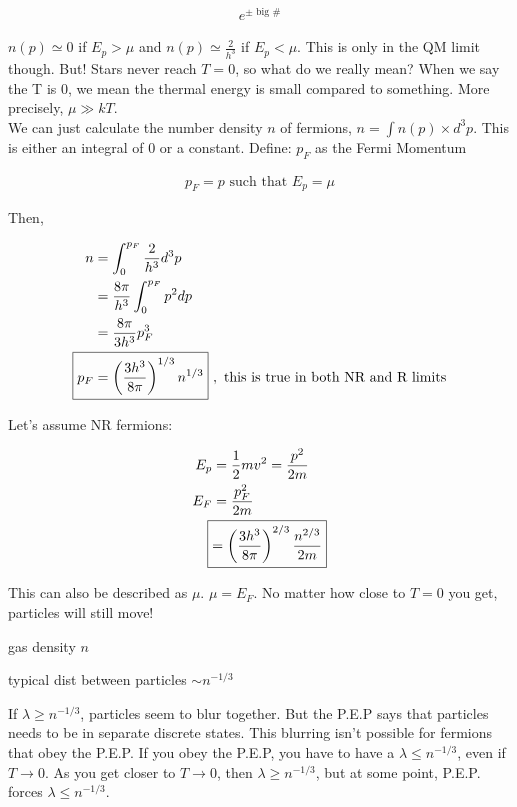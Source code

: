 \begin{align}
e^{\pm \text{ big \#}}
\end{align}

$n(p) \simeq 0 $ if $E_p > \mu$ and $n(p) \simeq \frac{2}{h^3} $ if $E_p < \mu$. This is only in the QM limit though. But! Stars never reach $T = 0$, so what do we really mean? When we say the T is 0, we mean the thermal energy is small compared to something. More precisely, $\mu \gg kT$. \\

We can just calculate the number density $n$ of fermions, $n = \int n(p) \times d^3p$. This is either an integral of 0 or a constant. Define: $p_F$ as the Fermi Momentum

\begin{align}
p_F = p \text{ such that }E_p = \mu
\end{align}

Then, 

\begin{align}
n &= \int_{0}^{p_F} \frac{2}{h^3}d^3p\\
&= \frac{8 \pi}{h^3} \int_0^{p_F} p^2 dp\\
&= \frac{8 \pi}{3h^3} p_F^3\\
\Aboxed{p_F &= \lp \frac{3h^3}{8 \pi} \rp^{1/3} n^{1/3}}~,\text{ this is true in both NR and R limits}
\end{align}

Let's assume NR fermions:

\begin{align}
E_p &= \frac{1}{2}mv^2 = \frac{p^2}{2m}\\
E_F &= \frac{p_F^2}{2m}\\
\Aboxed{&= \lp \frac{3h^3}{8 \pi} \rp ^{2/3} \frac{n^{2/3}}{2m} }
\end{align}

This can also be described as $\mu$. $\boxed{\mu = E_F}$. No matter how close to $T=0$ you get, particles will still move!

\begin{list}{}{}
\item gas density $n$
\item typical dist between particles $\sim n^{-1/3}$
\end{list}

If $\lambda \geq n^{-1/3}$, particles seem to blur together. But the P.E.P says that particles needs to be in separate discrete states. This blurring isn't possible for fermions that obey the P.E.P. If you obey the P.E.P, you have to have a $\lambda \leq n^{-1/3}$, even if $T \rightarrow 0$. As you get closer to $T \rightarrow 0$, then $\lambda \geq n^{-1/3}$, but at some point, P.E.P. forces $\lambda \leq n^{-1/3}$. 

